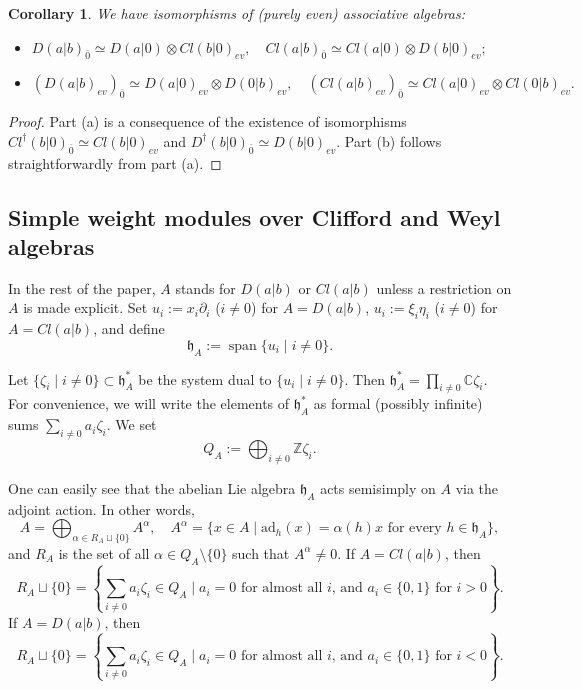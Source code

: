 \documentclass[12pt]{amsart}
\theoremstyle{plain} %
\numberwithin{equation}{section}
\theoremstyle{definition}
\theoremstyle{remark}
\theoremstyle{plain} %
\newtheorem{corollary}[definition]{Corollary}
\newcommand{\ad}{\mathrm{ad}}
\newcommand{\C}{\mathbb{C}}
\newcommand{\gh}{\mathfrak{h}}
\def\gh{\mathfrak{h}}
\begin{document}
   \begin{corollary}\label{even-iso} We have isomorphisms of (purely even) associative algebras:
   \begin{itemize}
\item[(a)]
$D(a|b)_{\bar 0}\simeq D(a|0)\otimes Cl(b|0)_{ev},\quad Cl(a|b)_{\bar 0}\simeq Cl(a|0)\otimes D(b|0)_{ev};$
\item[(b)]   $(D(a|b)_{ev})_{\bar 0} \simeq D(a|0)_{ev}\otimes D(0|b)_{ev},\quad (Cl(a|b)_{ev})_{\bar 0}\simeq Cl(a|0)_{ev}\otimes Cl(0|b)_{ev}.$
\end{itemize}
     \end{corollary}
     \begin{proof} Part (a)  is a consequence of the existence of  isomorphisms $Cl^{\dagger}(b|0)_{\bar 0}\simeq Cl(b|0)_{ev}$ and $ D^\dagger(b|0)_{\bar 0}\simeq D(b|0)_{ev}$. Part (b) follows straightforwardly from part (a).
       \end{proof} 

      \subsection{Simple weight modules over Clifford and Weyl algebras} \label{subsec-simple} In the rest of the paper, $A$ stands for $D(a|b)$ or $Cl(a|b)$ unless a restriction on $A$ is made explicit. Set $u_i:=x_i\partial_i$ ($ i  \neq 0$) for $A=D(a|b)$, $u_i:=\xi_i\eta_i$ ($ i  \neq 0$)  for $A=Cl(a|b)$, and define $$\gh_A:=\operatorname{span}\{u_i \mid i \neq 0\}.$$ 
   

Let $\{\zeta_i \; | \; i \neq 0\}\subset\gh_A^*$ be the system dual to $\{u_i \; | \; i \neq 0 \}$. 
                Then $\gh_A^* = \prod_{i \neq 0} \C \zeta_i$. For convenience, we will write the elements of $\gh_A^*$ as formal (possibly infinite) sums  $\sum_{i \neq 0}a_i \zeta_i $.
  We set  $$Q_A:=\bigoplus_{i \neq 0} \mathbb Z \zeta_i.$$ 
 
  One can easily see that the abelian Lie algebra $\gh_A$ acts semisimply on $A$ via the adjoint action.  In other words, 
     $$A= \bigoplus_{\alpha\in R_A \sqcup \{ 0 \} } A^\alpha,\quad A^\alpha=\{x\in A\mid \ad_h(x)=\alpha(h)x \mbox{ for every } h \in \gh_A\},$$
      and $R_A$ is the set of all $\alpha \in Q_A \setminus \{ 0 \}$ such that $A^{\alpha} \neq 0$.          
       If $A =Cl(a|b)$, then   $$R_A \sqcup \{ 0\}= \left\{ \sum_{i \neq 0} a_i \zeta_i \in Q_A \; |\; a_i=0 \mbox{ for almost all $i$, and }a_i\in \{0,1 \} \mbox{ for } i > 0   \right\}.$$
       If $A =D(a|b)$,   then $$R_A \sqcup \{ 0\}= \left\{ \sum_{i\neq 0} a_i \zeta_i \in Q_A \; |\; a_i=0 \mbox{ for almost all $i$, and }a_i\in \{0,1 \} \mbox{ for } i < 0   \right\}.$$
\end{document}
